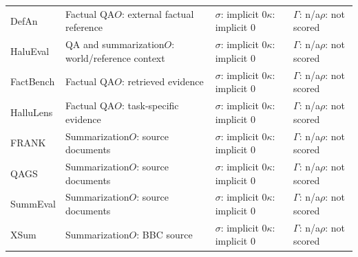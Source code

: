 \documentclass{clv2025}
\begin{document}
\begin{table}[t]
\begin{tabularx}{0.99\linewidth}{@{}P{0.22\textwidth}P{0.28\textwidth}P{0.18\textwidth}Y@{}}
DefAn \citep{rahman_defan_2024} & Factual QA\newline $O$: external factual reference & $\sigma$: implicit 0\newline $\kappa$: implicit 0 & $\Gamma$: n/a\newline $\rho$: not scored\\
HaluEval \citep{li_halueval_2023} & QA and summarization\newline $O$: world/reference context & $\sigma$: implicit 0\newline $\kappa$: implicit 0 & $\Gamma$: n/a\newline $\rho$: not scored\\
FactBench \citep{bayat_factbench_2024} & Factual QA\newline $O$: retrieved evidence & $\sigma$: implicit 0\newline $\kappa$: implicit 0 & $\Gamma$: n/a\newline $\rho$: not scored\\
HalluLens \citep{bang_hallulens_2025} & Factual QA\newline $O$: task-specific evidence & $\sigma$: implicit 0\newline $\kappa$: implicit 0 & $\Gamma$: n/a\newline $\rho$: not scored\\
FRANK \citep{pagnoni_understanding_2021} & Summarization\newline $O$: source documents & $\sigma$: implicit 0\newline $\kappa$: implicit 0 & $\Gamma$: n/a\newline $\rho$: not scored\\
QAGS \citep{wang_asking_2020} & Summarization\newline $O$: source documents & $\sigma$: implicit 0\newline $\kappa$: implicit 0 & $\Gamma$: n/a\newline $\rho$: not scored\\
SummEval \citep{fabbri_summeval_2021} & Summarization\newline $O$: source documents & $\sigma$: implicit 0\newline $\kappa$: implicit 0 & $\Gamma$: n/a\newline $\rho$: not scored\\
XSum \citep{narayan_xsum_2018} & Summarization\newline $O$: BBC source & $\sigma$: implicit 0\newline $\kappa$: implicit 0 & $\Gamma$: n/a\newline $\rho$: not scored\\
\bottomrule
\end{tabularx}
\end{table}
\end{document}
